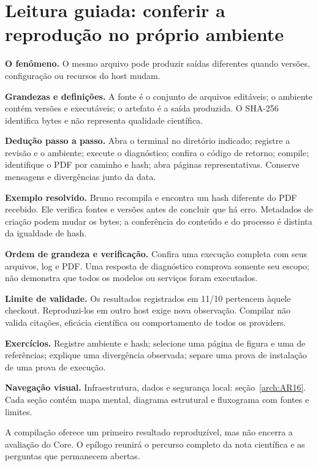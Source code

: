 \section[Leitura guiada]{Leitura guiada: conferir a reprodução no próprio ambiente}
\begin{descricao}
\textbf{O fenômeno.} O mesmo arquivo pode produzir saídas diferentes quando versões, configuração ou recursos do host mudam.
\end{descricao}
\begin{definicao}
\textbf{Grandezas e definições.} A fonte é o conjunto de arquivos editáveis; o ambiente contém versões e executáveis; o artefato é a saída produzida. O SHA-256 identifica bytes e não representa qualidade científica.
\end{definicao}
\begin{metodo}
\textbf{Dedução passo a passo.} Abra o terminal no diretório indicado; registre a revisão e o ambiente; execute o diagnóstico; confira o código de retorno; compile; identifique o PDF por caminho e hash; abra páginas representativas. Conserve mensagens e divergências junto da data.
\end{metodo}
\begin{resultado}
\textbf{Exemplo resolvido.} Bruno recompila e encontra um hash diferente do PDF recebido. Ele verifica fontes e versões antes de concluir que há erro. Metadados de criação podem mudar os bytes; a conferência do conteúdo e do processo é distinta da igualdade de hash.
\end{resultado}
\begin{resultado}
\textbf{Ordem de grandeza e verificação.} Confira uma execução completa com seus arquivos, log e PDF. Uma resposta de diagnóstico comprova somente seu escopo; não demonstra que todos os modelos ou serviços foram executados.
\end{resultado}
\begin{aviso}
\textbf{Limite de validade.} Os resultados registrados em 11/10 pertencem àquele checkout. Reproduzi-los em outro host exige nova observação. Compilar não valida citações, eficácia científica ou comportamento de todos os providers.
\end{aviso}
\begin{resultado}
\textbf{Exercícios.} Registre ambiente e hash; selecione uma página de figura e uma de referências; explique uma divergência observada; separe uma prova de instalação de uma prova de execução.
\end{resultado}



\begin{descricao}\textbf{Navegação visual.} Infraestrutura, dados e segurança local: seção~\ref{arch:AR16}. Cada seção contém mapa mental, diagrama estrutural e fluxograma com fontes e limites.\end{descricao}


A compilação oferece um primeiro resultado reproduzível, mas não encerra a avaliação do Core. O epílogo reunirá o percurso completo da nota científica e as perguntas que permanecem abertas.
